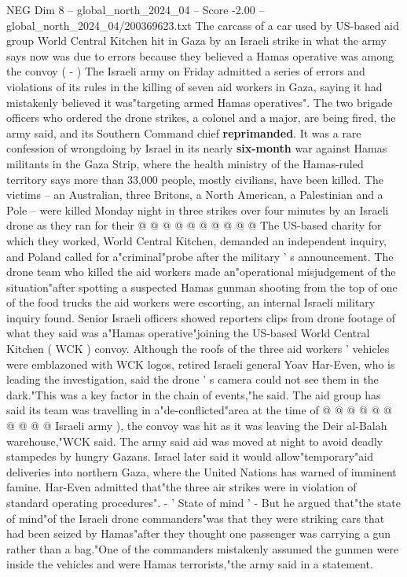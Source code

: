 \begin{textsample}{NEG Dim 8 – global\_north\_2024\_04 – Score -2.00 – global\_north\_2024\_04/200369623.txt}  \label{ex:f8_neg_132}
The carcass of a car used by US-based aid group World Central Kitchen hit in Gaza by an Israeli strike in what the army says now was due to errors because they believed a Hamas operative was among the convoy ( - ) The Israeli army on Friday admitted a series of errors and violations of its rules in the killing of seven aid workers in Gaza, saying it had mistakenly believed it was"targeting armed Hamas operatives".
The two brigade officers who ordered the drone strikes, a colonel and a major, are being fired, the army said, and its Southern Command chief \textbf{reprimanded}.
It was a rare confession of wrongdoing by Israel in its nearly \textbf{six-month} war against Hamas militants in the Gaza Strip, where the health ministry of the Hamas-ruled territory says more than 33,000 people, mostly civilians, have been killed.
The victims -- an Australian, three Britons, a North American, a Palestinian and a Pole -- were killed Monday night in three strikes over four minutes by an Israeli drone as they ran for their @ @ @ @ @ @ @ @ @ @ The US-based charity for which they worked, World Central Kitchen, demanded an independent inquiry, and Poland called for a"criminal"probe after the military ' s announcement.
The drone team who killed the aid workers made an"operational misjudgement of the situation"after spotting a suspected Hamas gunman shooting from the top of one of the food trucks the aid workers were escorting, an internal Israeli military inquiry found.
Senior Israeli officers showed reporters clips from drone footage of what they said was a"Hamas operative"joining the US-based World Central Kitchen ( WCK ) convoy.
Although the roofs of the three aid workers ' vehicles were emblazoned with WCK logos, retired Israeli general Yoav Har-Even, who is leading the investigation, said the drone ' s camera could not see them in the dark."This was a key factor in the chain of events,"he said.
The aid group has said its team was travelling in a"de-conflicted"area at the time of @ @ @ @ @ @ @ @ @ @ Israeli army ), the convoy was hit as it was leaving the Deir al-Balah warehouse,"WCK said.
The army said aid was moved at night to avoid deadly stampedes by hungry Gazans.
Israel later said it would allow"temporary"aid deliveries into northern Gaza, where the United Nations has warned of imminent famine.
Har-Even admitted that"the three air strikes were in violation of standard operating procedures". - ' State of mind ' - But he argued that"the state of mind"of the Israeli drone commanders"was that they were striking cars that had been seized by Hamas"after they thought one passenger was carrying a gun rather than a bag."One of the commanders mistakenly assumed the gunmen were inside the vehicles and were Hamas terrorists,"the army said in a statement.

\end{textsample}
